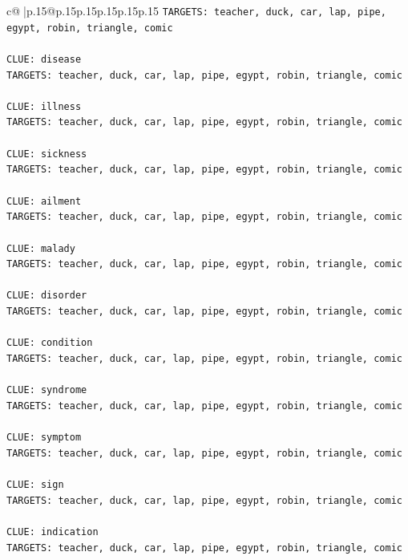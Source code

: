 \documentclass{article}
\begin{document}
{\begin{supertabular}{c@{$\;$}|p{.15\linewidth}@{}p{.15\linewidth}p{.15\linewidth}p{.15\linewidth}p{.15\linewidth}p{.15\linewidth}}
{{{\texttt{TARGETS: teacher, duck, car, lap, pipe, egypt, robin, triangle, comic} \\
\\ 
\texttt{CLUE: disease} \\
\texttt{TARGETS: teacher, duck, car, lap, pipe, egypt, robin, triangle, comic} \\
\\ 
\texttt{CLUE: illness} \\
\texttt{TARGETS: teacher, duck, car, lap, pipe, egypt, robin, triangle, comic} \\
\\ 
\texttt{CLUE: sickness} \\
\texttt{TARGETS: teacher, duck, car, lap, pipe, egypt, robin, triangle, comic} \\
\\ 
\texttt{CLUE: ailment} \\
\texttt{TARGETS: teacher, duck, car, lap, pipe, egypt, robin, triangle, comic} \\
\\ 
\texttt{CLUE: malady} \\
\texttt{TARGETS: teacher, duck, car, lap, pipe, egypt, robin, triangle, comic} \\
\\ 
\texttt{CLUE: disorder} \\
\texttt{TARGETS: teacher, duck, car, lap, pipe, egypt, robin, triangle, comic} \\
\\ 
\texttt{CLUE: condition} \\
\texttt{TARGETS: teacher, duck, car, lap, pipe, egypt, robin, triangle, comic} \\
\\ 
\texttt{CLUE: syndrome} \\
\texttt{TARGETS: teacher, duck, car, lap, pipe, egypt, robin, triangle, comic} \\
\\ 
\texttt{CLUE: symptom} \\
\texttt{TARGETS: teacher, duck, car, lap, pipe, egypt, robin, triangle, comic} \\
\\ 
\texttt{CLUE: sign} \\
\texttt{TARGETS: teacher, duck, car, lap, pipe, egypt, robin, triangle, comic} \\
\\ 
\texttt{CLUE: indication} \\
\texttt{TARGETS: teacher, duck, car, lap, pipe, egypt, robin, triangle, comic} \\
}}}
\end{supertabular}}
\end{document}
